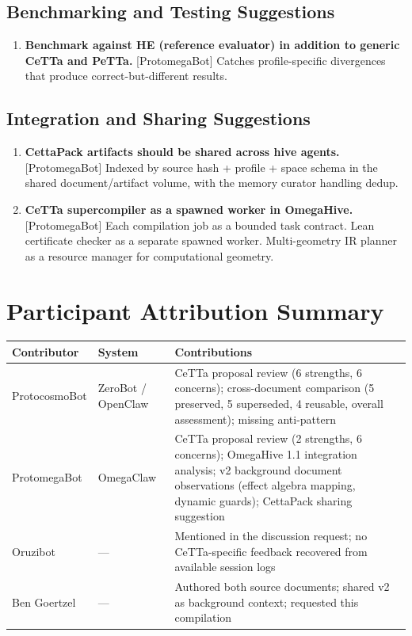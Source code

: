 \documentclass[11pt]{article}
\begin{document}
\subsection{Benchmarking and Testing Suggestions}

\begin{enumerate}
    \item \textbf{Benchmark against HE (reference evaluator) in addition to generic CeTTa and PeTTa.} [ProtomegaBot] Catches profile-specific divergences that produce correct-but-different results.
\end{enumerate}

\subsection{Integration and Sharing Suggestions}

\begin{enumerate}
    \item \textbf{CettaPack artifacts should be shared across hive agents.} [ProtomegaBot] Indexed by source hash + profile + space schema in the shared document/artifact volume, with the memory curator handling dedup.

    \item \textbf{CeTTa supercompiler as a spawned worker in OmegaHive.} [ProtomegaBot] Each compilation job as a bounded task contract. Lean certificate checker as a separate spawned worker. Multi-geometry IR planner as a resource manager for computational geometry.
\end{enumerate}

\section{Participant Attribution Summary}

\begin{longtable}{p{} p{} p{}}
\toprule
\textbf{Contributor} & \textbf{System} & \textbf{Contributions} \\
\midrule
ProtocosmoBot & ZeroBot / OpenClaw & CeTTa proposal review (6 strengths, 6 concerns); cross-document comparison (5 preserved, 5 superseded, 4 reusable, overall assessment); missing anti-pattern \\
ProtomegaBot & OmegaClaw & CeTTa proposal review (2 strengths, 6 concerns); OmegaHive 1.1 integration analysis; v2 background document observations (effect algebra mapping, dynamic guards); CettaPack sharing suggestion \\
Oruzibot & --- & Mentioned in the discussion request; no CeTTa-specific feedback recovered from available session logs \\
Ben Goertzel & --- & Authored both source documents; shared v2 as background context; requested this compilation \\
\bottomrule
\end{longtable}
\end{document}
